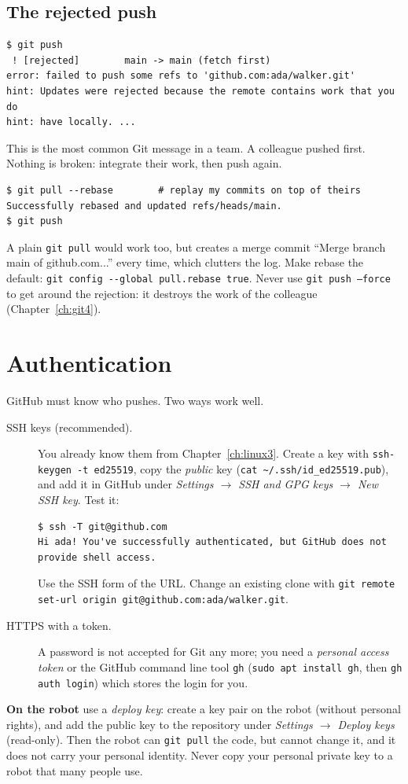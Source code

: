 \subsection*{The rejected push}
\begin{verbatim}
$ git push
 ! [rejected]        main -> main (fetch first)
error: failed to push some refs to 'github.com:ada/walker.git'
hint: Updates were rejected because the remote contains work that you do
hint: have locally. ...
\end{verbatim}
This is the most common Git message in a team. A colleague pushed first. Nothing is broken: integrate their work, then push again.
\begin{verbatim}
$ git pull --rebase        # replay my commits on top of theirs
Successfully rebased and updated refs/heads/main.
$ git push
\end{verbatim}
A plain \texttt{git pull} would work too, but creates a merge commit ``Merge branch main of github.com...'' every time, which clutters the log. Make rebase the default: \verb!git config --global pull.rebase true!. Never use \texttt{git push --force} to get around the rejection: it destroys the work of the colleague (Chapter~\ref{ch:git4}).

\section*{Authentication}
GitHub must know who pushes. Two ways work well.
\begin{description}
  \item[SSH keys (recommended).] You already know them from Chapter~\ref{ch:linux3}. Create a key with \verb!ssh-keygen -t ed25519!, copy the \emph{public} key (\verb!cat ~/.ssh/id_ed25519.pub!), and add it in GitHub under \emph{Settings $\rightarrow$ SSH and GPG keys $\rightarrow$ New SSH key}. Test it:
\begin{verbatim}
$ ssh -T git@github.com
Hi ada! You've successfully authenticated, but GitHub does not
provide shell access.
\end{verbatim}
  Use the SSH form of the URL. Change an existing clone with \verb!git remote set-url origin git@github.com:ada/walker.git!.
  \item[HTTPS with a token.] A password is not accepted for Git any more; you need a \emph{personal access token} or the GitHub command line tool \texttt{gh} (\verb!sudo apt install gh!, then \verb!gh auth login!) which stores the login for you.
\end{description}
\textbf{On the robot} use a \emph{deploy key}: create a key pair on the robot (without personal rights), and add the public key to the repository under \emph{Settings $\rightarrow$ Deploy keys} (read-only). Then the robot can \texttt{git pull} the code, but cannot change it, and it does not carry your personal identity. Never copy your personal private key to a robot that many people use.

